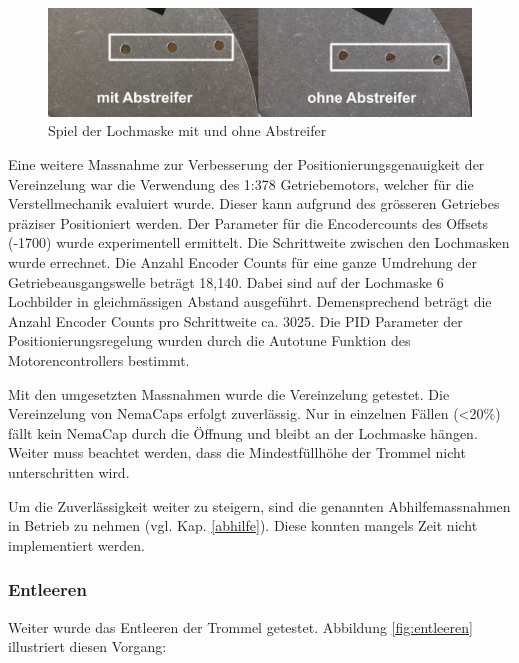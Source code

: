 \begin{figure}[H]
	\includegraphics[draft=false,width=1\textwidth]{Illustrationen/7-Inbetriebnahme_und_Kalibration/spiel_lochmaske_1.jpg}
	\caption{Spiel der Lochmaske mit und ohne Abstreifer}
	\label{fig:spiel_lochmaske}
\end{figure}

Eine weitere Massnahme zur Verbesserung der Positionierungsgenauigkeit der Vereinzelung war die Verwendung des 1:378 Getriebemotors, welcher für die Verstellmechanik evaluiert wurde. Dieser kann aufgrund des grösseren Getriebes präziser Positioniert werden. Der Parameter für die Encodercounts des Offsets (-1700) wurde experimentell ermittelt. Die Schrittweite zwischen den Lochmasken wurde errechnet. Die Anzahl Encoder Counts für eine ganze Umdrehung der Getriebeausgangswelle beträgt 18,140. Dabei sind auf der Lochmaske 6 Lochbilder in gleichmässigen Abstand ausgeführt. Demensprechend beträgt die Anzahl Encoder Counts pro Schrittweite ca. 3025. Die PID Parameter der Positionierungsregelung wurden durch die Autotune Funktion des Motorencontrollers bestimmt.
\newline

Mit den umgesetzten Massnahmen wurde die Vereinzelung getestet. Die Vereinzelung von NemaCaps erfolgt zuverlässig. Nur in einzelnen Fällen (<20\%) fällt kein NemaCap durch die Öffnung und bleibt an der Lochmaske hängen. Weiter muss beachtet werden, dass die Mindestfüllhöhe der Trommel nicht unterschritten wird.
\newline

Um die Zuverlässigkeit weiter zu steigern, sind die genannten Abhilfemassnahmen in Betrieb zu nehmen (vgl. Kap. \ref{abhilfe}). Diese konnten mangels Zeit nicht implementiert werden.

\subsubsection{Entleeren}
Weiter wurde das Entleeren der Trommel getestet. Abbildung \ref{fig:entleeren} illustriert diesen Vorgang:

